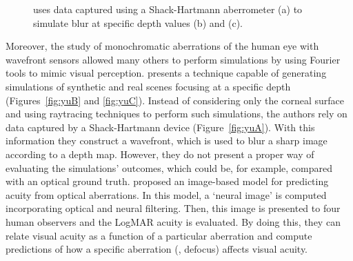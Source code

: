 \begin{figure}[!b]
	\caption{\citet{Yu2001} uses data captured using a Shack-Hartmann aberrometer (a) to simulate blur at specific depth values (b) and (c).}
	\label{fig:yu}
\end{figure}

Moreover, the study of monochromatic aberrations of the human eye with wavefront sensors \cite{Liang1994} allowed many others to perform simulations by using Fourier tools to mimic visual perception. \citet{Yu2001} presents a technique capable of generating simulations of synthetic and  real scenes focusing at a specific depth (Figures~\ref{fig:yuB} and \ref{fig:yuC}). Instead of considering only the corneal surface and using raytracing techniques to perform such simulations, the authors rely on data captured by a Shack-Hartmann device (Figure~\ref{fig:yuA}). With this information they construct a wavefront, which is used to blur a sharp image according to a depth map. However, they do not present a proper way of evaluating the simulations' outcomes, which could be, for example, compared with an optical ground truth. 
\citet{Watson2008} proposed an image-based model for predicting acuity from optical aberrations. In this model, a `neural image' is computed incorporating optical and neural filtering. Then, this image is presented to four human observers and the LogMAR acuity is evaluated. By doing this, they can relate visual acuity as a function of a particular aberration and compute predictions of how a specific aberration (\eg, defocus) affects visual acuity.

